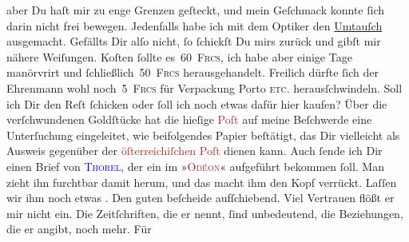                aber Du haſt mir zu enge Grenzen geſteckt, und mein Geſchmack konnte ſich darin nicht
               frei bewegen. Jedenfalls habe ich mit dem Optiker den \uline{Umtauſch} ausgemacht. Gefällts Dir alſo nicht, ſo ſchickſt Du mirs zurück und
               gibſt mir nähere Weiſungen. Koſten ſollte es 60 \textsc{Frcs}, ich
               habe aber einige Tage {\pb}manörvrirt und
                  ſchließlich 50 \textsc{Frcs} herausgehandelt. Freilich dürfte
               ſich der Ehrenmann wohl noch 5 \textsc{Frcs} für Verpackung Porto
                  \textsc{etc.} herausſchwindeln. Soll ich Dir den Reſt ſchicken
               oder ſoll ich noch etwas dafür hier kaufen?\pend
           \pstart
           Über die verſchwundenen Goldſtücke hat die hieſige \textcolor{brown}{Poſt}{}\ledrightnote{\textcolor{brown}{Französische Post}} auf meine Beſchwerde eine Unterſuchung eingeleitet, wie beifolgendes
                  {\pb}Papier beſtätigt, das Dir vielleicht als Ausweis
               gegenüber der \textcolor{brown}{öſterreichiſchen Poſt}{}\ledrightnote{\textcolor{brown}{Österreichische Post}} dienen
               kann.\pend
           \pstart
           Auch ſende ich Dir einen Brief von \textsc{\textcolor{blue}{Thorel}{}\ledrightnote{\textcolor{blue}{Jean Thorel}}}, der ein \label{K_L02762-3v}\label{K_L02762-3h} im
                  »\textsc{\textcolor{brown}{Odéon}{}\ledrightnote{\textcolor{brown}{Odéon}}}« aufgeführt bekommen ſoll. Man zieht ihn furchtbar damit herum, und das macht
               ihm den Kopf verrückt. Laſſen wir ihm noch etwas \label{K_L02762-2v}\label{K_L02762-2h}.\pend
           \pstart
           Den guten \label{K_L02762-4v}\label{K_L02762-4h} beſcheide aufſchiebend. Viel Vertrauen flößt er mir nicht ein. Die
               Zeitſchriften, die er  nennt, ſind unbedeutend,
               die  Beziehungen, die er angibt, noch mehr. Für
